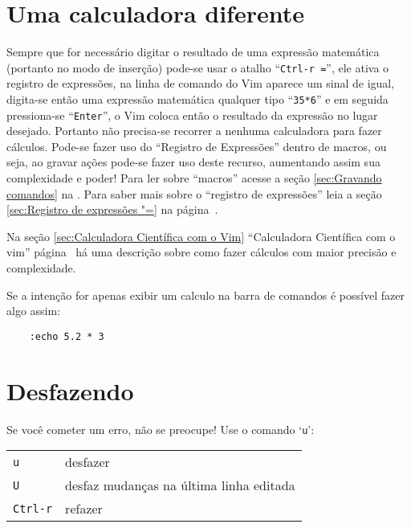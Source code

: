\section{Uma calculadora diferente}
\label{Uma calculadora diferente}

Sempre que for necessário digitar  o resultado de uma expressão matemática
(portanto no modo de inserção) pode-se usar o atalho ``{\tt Ctrl-r =}'', ele
ativa o registro de expressões, na linha de comando do Vim aparece um sinal de
igual, digita-se então uma expressão matemática qualquer tipo ``{\tt 35*6}'' e
em seguida pressiona-se ``{\tt Enter}'', o Vim coloca então o resultado da
expressão no lugar desejado.  Portanto não precisa-se recorrer a nenhuma
calculadora para fazer cálculos.  Pode-se fazer uso do ``Registro de
Expressões'' dentro de macros, ou seja, ao gravar ações pode-se fazer uso deste
recurso, aumentando assim sua complexidade e poder! Para ler sobre ``macros''
acesse a seção \ref{sec:Gravando comandos} na \pageref{sec:Gravando comandos}.
Para saber mais sobre o ``registro de expressões'' leia a seção
\ref{sec:Registro de expressões "=} na página~\pageref{sec:Registro de expressões "=}.

{\Large {}} Na seção \ref{sec:Calculadora Científica com o Vim}
``Calculadora Científica com o vim'' página~\pageref{sec:Calculadora Científica com
o Vim} há uma descrição sobre como fazer cálculos com maior precisão e
complexidade.

{\Large {}} Se a intenção for apenas exibir um calculo na barra de comandos
é possível fazer algo assim:

\begin{verbatim}
    :echo 5.2 * 3
\end{verbatim}

\section{Desfazendo}
\label{Desfazendo}

Se você cometer um erro, não se preocupe! Use o comando `{\tt u}':

\begin{table}[htb]\begin{center} \begin{tabular}{ll} \hline
     \verb|u| & desfazer\\
     \verb|U| & desfaz mudanças na última linha editada\\
     \verb|Ctrl-r| & refazer\\
\hline \end{tabular}\end{center}\end{table}

